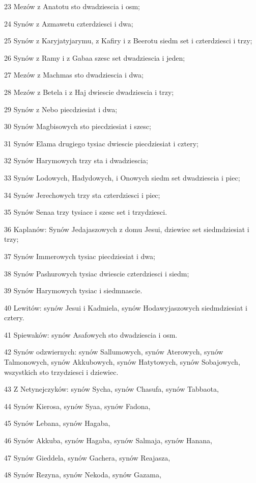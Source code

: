\par 23 Mezów z Anatotu sto dwadziescia i osm;
\par 24 Synów z Azmawetu czterdziesci i dwa;
\par 25 Synów z Karyjatyjarymu, z Kafiry i z Beerotu siedm set i czterdziesci i trzy;
\par 26 Synów z Ramy i z Gabaa szesc set dwadziescia i jeden;
\par 27 Mezów z Machmas sto dwadziescia i dwa;
\par 28 Mezów z Betela i z Haj dwiescie dwadziescia i trzy;
\par 29 Synów z Nebo piecdziesiat i dwa;
\par 30 Synów Magbisowych sto piecdziesiat i szesc;
\par 31 Synów Elama drugiego tysiac dwiescie piecdziesiat i cztery;
\par 32 Synów Harymowych trzy sta i dwadziescia;
\par 33 Synów Lodowych, Hadydowych, i Onowych siedm set dwadziescia i piec;
\par 34 Synów Jerechowych trzy sta czterdziesci i piec;
\par 35 Synów Senaa trzy tysiace i szesc set i trzydziesci.
\par 36 Kaplanów: Synów Jedajaszowych z domu Jesui, dziewiec set siedmdziesiat i trzy;
\par 37 Synów Immerowych tysiac piecdziesiat i dwa;
\par 38 Synów Pashurowych tysiac dwiescie czterdziesci i siedm;
\par 39 Synów Harymowych tysiac i siedmnascie.
\par 40 Lewitów: synów Jesui i Kadmiela, synów Hodawyjaszowych siedmdziesiat i cztery.
\par 41 Spiewaków: synów Asafowych sto dwadziescia i osm.
\par 42 Synów odzwiernych: synów Sallumowych, synów Aterowych, synów Talmonowych, synów Akkubowych, synów Hatytowych, synów Sobajowych, wszystkich sto trzydziesci i dziewiec.
\par 43 Z Netynejczyków: synów Sycha, synów Chasufa, synów Tabbaota,
\par 44 Synów Kierosa, synów Syaa, synów Fadona,
\par 45 Synów Lebana, synów Hagaba,
\par 46 Synów Akkuba, synów Hagaba, synów Salmaja, synów Hanana,
\par 47 Synów Gieddela, synów Gachera, synów Reajasza,
\par 48 Synów Rezyna, synów Nekoda, synów Gazama,
